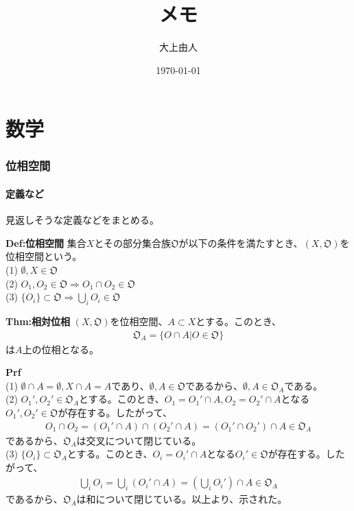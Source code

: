 \documentclass[a4paper,11pt]{jsarticle}
\numberwithin{equation}{section}
\begin{document}
\title{メモ}
\author{大上由人}
\date{\today}
\maketitle

\tableofcontents
\newpage

\part{数学}
\section{位相空間}
\subsection{定義など}
見返しそうな定義などをまとめる。\\
\begin{itembox}[l]{\textbf{Def:位相空間}}
  集合$X$とその部分集合族$\mathfrak{O}$が以下の条件を満たすとき、$(X,\mathfrak{O})$を位相空間という。\\
  (1) $\emptyset, X \in \mathfrak{O}$\\
  (2) $O_1,O_2 \in \mathfrak{O} \Rightarrow O_1 \cap O_2 \in \mathfrak{O}$\\
  (3) $\{O_i\} \subset \mathfrak{O} \Rightarrow \bigcup_{i} O_i \in \mathfrak{O}$\\
\end{itembox}

\begin{itembox}[l]{\textbf{Thm:相対位相}}
  $(X,\mathfrak{O})$を位相空間、$A \subset X$とする。このとき、
  \begin{align}
    \mathfrak{O}_A = \{O \cap A | O \in \mathfrak{O}\}
  \end{align}
  は$A$上の位相となる。
\end{itembox}
\textbf{Prf}\\
(1) $\emptyset \cap A = \emptyset, X \cap A = A$であり、$\emptyset, A \in \mathfrak{O}$であるから、$\emptyset, A \in \mathfrak{O}_A$である。\\
(2) $O_1',O_2' \in \mathfrak{O}_A$とする。このとき、$O_1 = O_1' \cap A, O_2 = O_2' \cap A$となる$O_1',O_2' \in \mathfrak{O}$が存在する。したがって、
\begin{align}
  O_1 \cap O_2 = (O_1' \cap A) \cap (O_2' \cap A) = (O_1' \cap O_2') \cap A \in \mathfrak{O}_A
\end{align}
であるから、$\mathfrak{O}_A$は交叉について閉じている。\\
(3) $\{O_i\} \subset \mathfrak{O}_A$とする。このとき、$O_i = O_i' \cap A$となる$O_i' \in \mathfrak{O}$が存在する。したがって、
\begin{align}
  \bigcup_{i} O_i = \bigcup_{i} (O_i' \cap A) = \left(\bigcup_{i} O_i'\right) \cap A \in \mathfrak{O}_A
\end{align}
であるから、$\mathfrak{O}_A$は和について閉じている。以上より、示された。\hfill\qedsymbol\\
\end{document}
